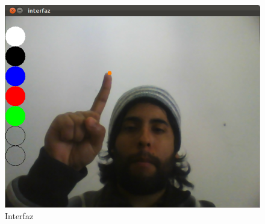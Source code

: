 \documentclass[conference,a4paper,10pt,oneside,final]{tfmpd}
\begin{document}
	\begin{figure}[tbhp]
	\centerline{\includegraphics[scale=0.2]{7_interfaz}}
	\caption{Interfaz}
	\label{fig:7_interfaz}
	\end{figure}
	
	
	\nocite{*}
	
	
\end{document}
